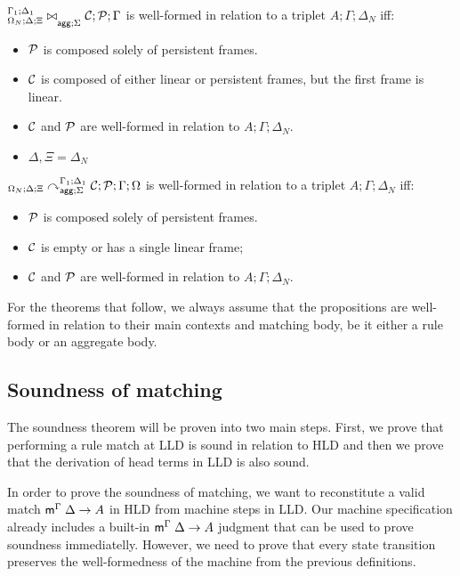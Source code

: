 \begin{definition}
${{}^{\Gamma_1 ; \Delta_1}_{\Omega_N ; \Delta; \Xi}\bowtie}_{\mathsf{agg} ; \Sigma} \; \mathcal{C}; \mathcal{P} ; \Gamma$ is
well-formed in relation to a triplet $A; \Gamma; \Delta_{N}$ iff:

\begin{itemize}[leftmargin=*]
   \item $\mathcal{P}$ is composed solely of persistent frames.
   \item $\mathcal{C}$ is composed of either linear or persistent frames, but the first
   frame is linear.
   \item $\mathcal{C}$ and $\mathcal{P}$ are well-formed in relation to $A; \Gamma; \Delta_{N}$.
   \item $\Delta, \Xi = \Delta_{N}$
\end{itemize}
\end{definition}

\begin{definition}
${{}_{\Omega_N ; \Delta ; \Xi}\curvearrowright}_{\mathsf{agg} ; \Sigma}^{\Gamma_1; \Delta_1} \; \mathcal{C};
      \mathcal{P} ; \Gamma ; \Omega$
is well-formed in relation to a triplet $A; \Gamma; \Delta_{N}$ iff:

\begin{itemize}[leftmargin=*]
   \item $\mathcal{P}$ is composed solely of persistent frames.
   \item $\mathcal{C}$ is empty or has a single linear frame;
   \item $\mathcal{C}$ and $\mathcal{P}$ are well-formed in relation to $A; \Gamma; \Delta_{N}$.
\end{itemize}

\end{definition}

For the theorems that follow, we always assume that the propositions are
well-formed in relation to their main contexts and matching body, be it either a
rule body or an aggregate body.

\subsection{Soundness of matching}

The soundness theorem will be proven into two main steps. First, we prove that
performing a rule match at LLD is sound in relation to HLD and then we prove
that the derivation of head terms in LLD is also sound.

In order to prove the soundness of matching, we want to reconstitute a valid
match $\mathsf{m}^{\Gamma} \; \Delta \rightarrow A$ in HLD from machine steps in LLD. Our machine
specification already includes a built-in $\mathsf{m}^{\Gamma} \; \Delta \rightarrow A$ judgment that
can be used to prove soundness immediatelly. However, we need to prove that
every state transition preserves the well-formedness of the machine from the
previous definitions.


